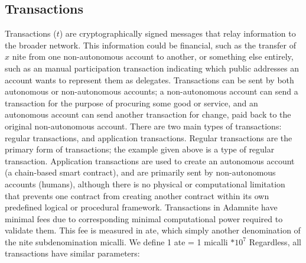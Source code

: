 \documentclass[conference]{IEEEtran}
\begin{document}
\subsection {Transactions}
 Transactions ($t$) are cryptographically signed messages that relay information to the broader network. This information could be financial, such as the transfer of $x$ nite from one non-autonomous account to another, or something else entirely, such as an manual participation transaction indicating which public addresses an account wants to represent them as delegates. Transactions can be sent by both autonomous or non-autonomous accounts; a non-autonomous account can send a transaction for the purpose of procuring some good or service, and an autonomous account can send another transaction for change, paid back to the original non-autonomous account. There are two main types of transactions: regular transactions, and application transactions. Regular transactions are the primary form of transactions; the example given above is a type of regular transaction. Application transactions are used to create an autonomous account (a chain-based smart contract), and are primarily sent by non-autonomous accounts (humans), although there is no physical or computational limitation that prevents one contract from creating another contract within its own predefined logical or procedural framework. Transactions in Adamnite have minimal fees due to corresponding minimal computational power required to validate them. This fee is measured in ate, which simply another denomination of the nite subdenomination micalli. We define 1 ate = 1 micalli $* 10^7$
 Regardless, all transactions have similar parameters:
\end{document}

